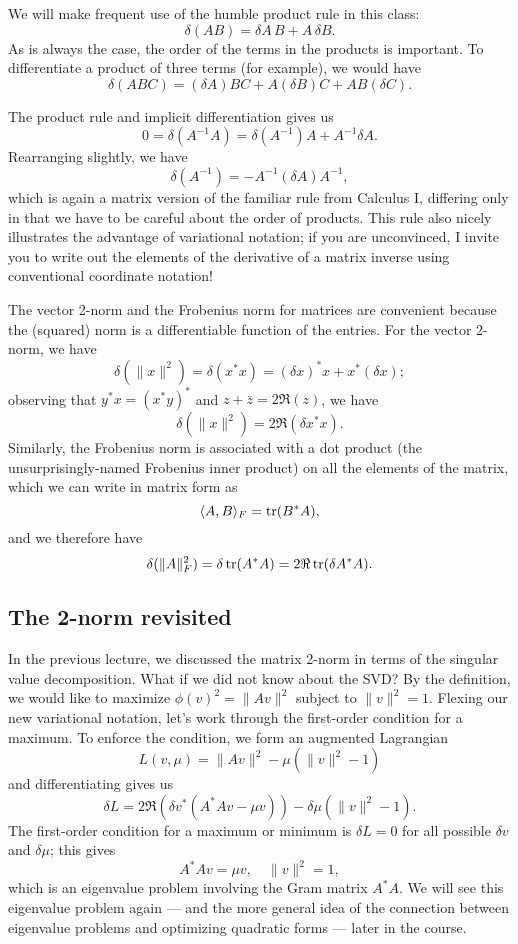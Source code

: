 \documentclass[12pt, leqno]{article} %
\begin{document}
We will make frequent use of the humble product rule in this class:
\[
  \delta (AB) = \delta A \, B + A \, \delta B.
\]
As is always the case, the order of the terms in the products is
important.  To differentiate a product of three terms (for example),
we would have
\[
  \delta (ABC) = (\delta A) BC + A (\delta B) C + AB(\delta C).
\]

The product rule and implicit differentiation gives us
\[
  0 = \delta (A^{-1} A) = \delta (A^{-1}) A + A^{-1} \delta A.
\]
Rearranging slightly, we have
\[
  \delta (A^{-1}) = -A^{-1} (\delta A) A^{-1},
\]
which is again a matrix version of the familiar rule from Calculus I,
differing only in that we have to be careful about the order of
products.  This rule also nicely illustrates the advantage of variational
notation; if you are unconvinced, I invite you to write out the
elements of the derivative of a matrix inverse using conventional
coordinate notation!

The vector 2-norm and the Frobenius norm for matrices are convenient
because the (squared) norm is a differentiable function of the entries.
For the vector 2-norm, we have
\[
  \delta(\|x\|^2) = \delta(x^* x) = (\delta x)^* x + x^* (\delta x);
\]
observing that $y^* x = (x^* y)^*$ and $z + \bar{z} = 2 \Re(z)$,
we have
\[
  \delta(\|x\|^2) = 2 \Re(\delta x^* x).
\]
Similarly, the Frobenius norm is associated with a dot product
(the unsurprisingly-named Frobenius inner product) on all the elements
of the matrix, which we can write in matrix form as
\[
  \langle A, B \rangle_F = \operatorname{tr}(B^* A),
\]
and we therefore have
\[
  \delta (\|A\|_F^2) = \delta \operatorname{tr}(A^* A) = 2 \Re \operatorname{tr}(\delta A^* A).
\]

\subsection{The 2-norm revisited}

In the previous lecture, we discussed the matrix 2-norm in terms
of the singular value decomposition.  What if we did not know about
the SVD?  By the definition, we would like to maximize
$\phi(v)^2 = \|Av\|^2$ subject to $\|v\|^2 = 1$.  Flexing our
new variational notation, let's work through the first-order condition
for a maximum.  To enforce the condition, we form an augmented
Lagrangian
\[
  L(v,\mu) = \|Av\|^2 - \mu (\|v\|^2 - 1)
\]
and differentiating gives us
\[
  \delta L = 2 \Re (\delta v^* (A^* A v - \mu v)) - \delta \mu (\|v\|^2 - 1).
\]
The first-order condition for a maximum or minimum is $\delta L = 0$
for all possible $\delta v$ and $\delta \mu$; this gives
\[
  A^* A v = \mu v, \quad \|v\|^2 = 1,
\]
which is an eigenvalue problem involving the Gram matrix $A^* A$.
We will see this eigenvalue problem again --- and the more general idea
of the connection between eigenvalue problems and
optimizing quadratic forms --- later in the course.
\end{document}
